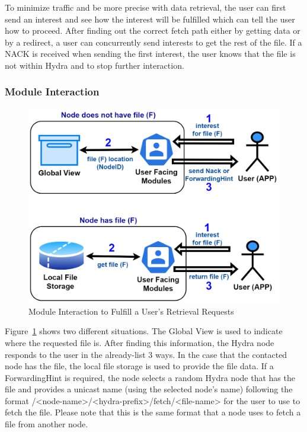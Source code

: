 To minimize traffic and be more precise with data retrieval, the user can first send an interest and see how the interest will be fulfilled which can tell the user how to proceed. After finding out the correct fetch path either by getting data or by a redirect, a user can concurrently send interests to get the rest of the file. If a NACK is received when sending the first interest, the user knows that the file is not within Hydra and to stop further interaction.

\subsubsection{Module Interaction}
\begin{figure}[!ht]
    \centering
    \includegraphics[width=\columnwidth]{visuals/fetch-sys.png}
    \caption{Module Interaction to Fulfill a User's Retrieval Requests}
    \label{fig:fetch-sys}
\end{figure}

Figure~\ref{fig:fetch-sys} shows two different situations. The Global View is used to indicate where the requested file is. After finding this information, the Hydra node responds to the user in the already-list 3 ways. In the case that the contacted node has the file, the local file storage is used to provide the file data. If a ForwardingHint is required, the node selects a random Hydra node that has the file and provides a unicast name (using the selected node's name) following the format /<node-name>/<hydra-prefix>/fetch/<file-name> for the user to use to fetch the file. Please note that this is the same format that a node uses to fetch a file from another node.